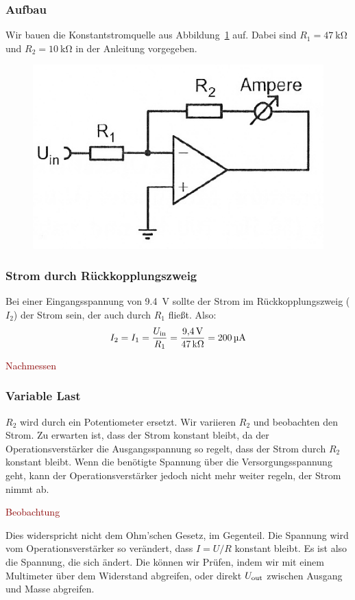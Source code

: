 \subsubsection{Aufbau}

Wir bauen die Konstantstromquelle aus Abbildung~\ref{fig:5-1} auf. Dabei sind
$R_1 = \SI{47}{\kilo\ohm}$ und $R_2 = \SI{10}{\kilo\ohm}$ in der Anleitung
vorgegeben.

\begin{figure}[htbp]
	\centering
	\includegraphics[width=.5\linewidth]{Anleitung/5-1.png}
	\caption{%
		\cite[Abbildung~5.1]{physik313-Anleitung}
	}
	\label{fig:5-1}
\end{figure}

\subsubsection{Strom durch Rückkopplungszweig}

Bei einer Eingangsspannung von \SI{9.4}{\volt} sollte der Strom im
Rückkopplungszweig ($I_2$) der Strom sein, der auch durch $R_1$ fließt. Also:
\[
	I_2
	= I_1
	= \frac{U_\text{in}}{R_1}
	= \frac{\SI{9.4}\volt}{\SI{47}{\kilo\ohm}}
	= \SI{200}{\micro\ampere}
\]

\textcolor{darkred}{Nachmessen}

\subsubsection{Variable Last}

$R_2$ wird durch ein Potentiometer ersetzt. Wir variieren $R_2$ und beobachten
den Strom. Zu erwarten ist, dass der Strom konstant bleibt, da der
Operationsverstärker die Ausgangsspannung so regelt, dass der Strom durch $R_2$
konstant bleibt. Wenn die benötigte Spannung über die Versorgungsspannung geht,
kann der Operationsverstärker jedoch nicht mehr weiter regeln, der Strom nimmt
ab.

\textcolor{darkred}{Beobachtung}

Dies widerspricht nicht dem Ohm'schen Gesetz, im Gegenteil. Die Spannung wird
vom Operationsverstärker so verändert, dass $I = U/R$ konstant bleibt. Es ist
also die Spannung, die sich ändert. Die können wir Prüfen, indem wir mit einem
Multimeter über dem Widerstand abgreifen, oder direkt $U_\text{out}$ zwischen Ausgang
und Masse abgreifen.

